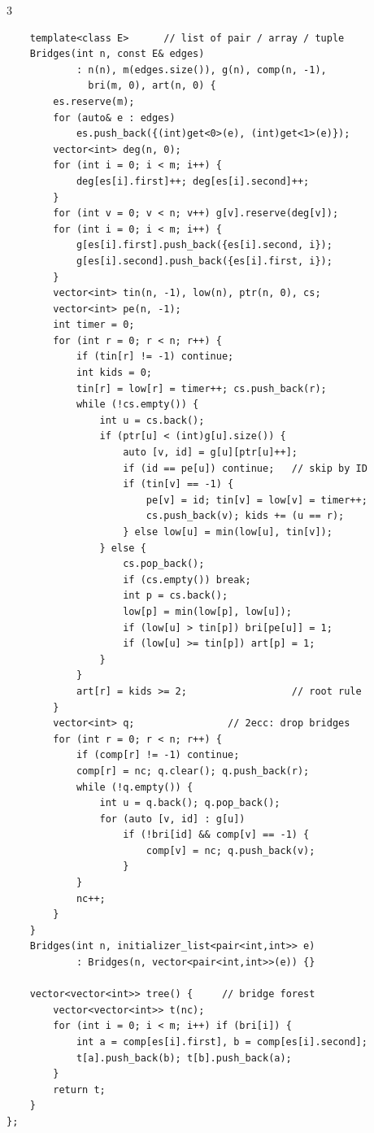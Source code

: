 \documentclass[9pt,a4paper]{extarticle}
\begin{document}
\begin{multicols*}{3}
\begin{lstlisting}
    template<class E>      // list of pair / array / tuple
    Bridges(int n, const E& edges)
            : n(n), m(edges.size()), g(n), comp(n, -1),
              bri(m, 0), art(n, 0) {
        es.reserve(m);
        for (auto& e : edges)
            es.push_back({(int)get<0>(e), (int)get<1>(e)});
        vector<int> deg(n, 0);
        for (int i = 0; i < m; i++) {
            deg[es[i].first]++; deg[es[i].second]++;
        }
        for (int v = 0; v < n; v++) g[v].reserve(deg[v]);
        for (int i = 0; i < m; i++) {
            g[es[i].first].push_back({es[i].second, i});
            g[es[i].second].push_back({es[i].first, i});
        }
        vector<int> tin(n, -1), low(n), ptr(n, 0), cs;
        vector<int> pe(n, -1);
        int timer = 0;
        for (int r = 0; r < n; r++) {
            if (tin[r] != -1) continue;
            int kids = 0;
            tin[r] = low[r] = timer++; cs.push_back(r);
            while (!cs.empty()) {
                int u = cs.back();
                if (ptr[u] < (int)g[u].size()) {
                    auto [v, id] = g[u][ptr[u]++];
                    if (id == pe[u]) continue;   // skip by ID
                    if (tin[v] == -1) {
                        pe[v] = id; tin[v] = low[v] = timer++;
                        cs.push_back(v); kids += (u == r);
                    } else low[u] = min(low[u], tin[v]);
                } else {
                    cs.pop_back();
                    if (cs.empty()) break;
                    int p = cs.back();
                    low[p] = min(low[p], low[u]);
                    if (low[u] > tin[p]) bri[pe[u]] = 1;
                    if (low[u] >= tin[p]) art[p] = 1;
                }
            }
            art[r] = kids >= 2;                  // root rule
        }
        vector<int> q;                // 2ecc: drop bridges
        for (int r = 0; r < n; r++) {
            if (comp[r] != -1) continue;
            comp[r] = nc; q.clear(); q.push_back(r);
            while (!q.empty()) {
                int u = q.back(); q.pop_back();
                for (auto [v, id] : g[u])
                    if (!bri[id] && comp[v] == -1) {
                        comp[v] = nc; q.push_back(v);
                    }
            }
            nc++;
        }
    }
    Bridges(int n, initializer_list<pair<int,int>> e)
            : Bridges(n, vector<pair<int,int>>(e)) {}

    vector<vector<int>> tree() {     // bridge forest
        vector<vector<int>> t(nc);
        for (int i = 0; i < m; i++) if (bri[i]) {
            int a = comp[es[i].first], b = comp[es[i].second];
            t[a].push_back(b); t[b].push_back(a);
        }
        return t;
    }
};
\end{lstlisting}


\end{multicols*}
\end{document}
